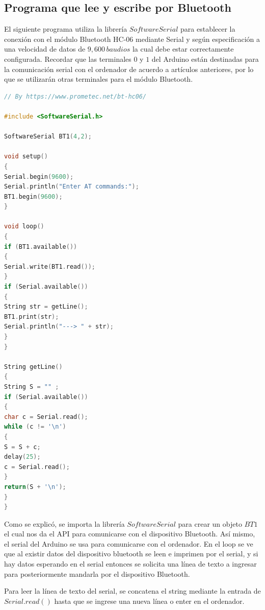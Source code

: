 \documentclass[conference]{IEEEtran}
\begin{document}
\subsection{Programa que lee y escribe por Bluetooth}

El siguiente programa utiliza la librería $SoftwareSerial$ para establecer la conexión con el módulo Bluetooth HC-06 mediante Serial y según especificación a una velocidad de datos de $9,600 \, baudios$ la cual debe estar correctamente configurada. Recordar que las terminales $0$ y $1$ del Arduino están destinadas para la comunicación serial con el ordenador de acuerdo a artículos anteriores, por lo que se utilizarán otras terminales para el módulo Bluetooth.

\begin{lstlisting}[language=C, caption=Programa que lee y escribe por Bluetooth. Fuente: www.prometec.net $\mid$ MÓDULO BLUETOOTH HC-06. Under fair use. \cite{prometecnet-2019}]
// By https://www.prometec.net/bt-hc06/

#include <SoftwareSerial.h>

SoftwareSerial BT1(4,2);

void setup()
{
Serial.begin(9600);
Serial.println("Enter AT commands:");
BT1.begin(9600);
}

void loop()
{
if (BT1.available())
{
Serial.write(BT1.read());
}
if (Serial.available())
{
String str = getLine();
BT1.print(str);
Serial.println("---> " + str);
}
}

String getLine()
{
String S = "" ;
if (Serial.available())
{
char c = Serial.read();
while (c != '\n')
{
S = S + c;
delay(25);
c = Serial.read();
}
return(S + '\n');
}
}
\end{lstlisting}

\bigbreak

Como se explicó, se importa la librería $SoftwareSerial$ para crear un objeto $BT1$ el cual nos da el API para comunicarse con el dispositivo Bluetooth. Así mismo, el serial del Arduino se usa para comunicarse con el ordenador. En el loop se ve que al existir datos del dispositivo bluetooth se leen e imprimen por el serial, y si hay datos esperando en el serial entonces se solicita una línea de texto a ingresar para posteriormente mandarla por el dispositivo Bluetooth.

\bigbreak

Para leer la línea de texto del serial, se concatena el string mediante la entrada de $Serial.read()$ hasta que se ingrese una nueva línea o enter en el ordenador.
\end{document}
